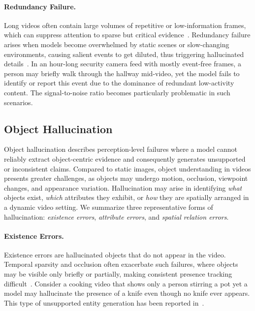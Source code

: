 \documentclass[10pt]{article} %
\begin{document}
\paragraph{Redundancy Failure.}
Long videos often contain large volumes of repetitive or low-information frames, which can suppress attention to sparse but critical evidence~\citep{yunzhuzhang2025flexselect, hu2025m, yu2024frame}. Redundancy failure arises when models become overwhelmed by static scenes or slow-changing environments, causing salient events to get diluted, thus triggering hallucinated details~\citep{zhang2025adard, zhang2025prompt, tan2026think}. In an hour-long security camera feed with mostly event-free frames, a person may briefly walk through the hallway mid-video, yet the model fails to identify or report this event due to the dominance of redundant low-activity content. The signal-to-noise ratio becomes particularly problematic in such scenarios.

\subsection{Object Hallucination}\label{subsec:object-hallucination}

Object hallucination describes perception-level failures where a model cannot reliably extract object-centric evidence and consequently generates unsupported or inconsistent claims. Compared to static images, object understanding in videos presents greater challenges, as objects may undergo motion, occlusion, viewpoint changes, and appearance variation. Hallucination may arise in identifying \emph{what} objects exist, \emph{which} attributes they exhibit, or \emph{how} they are spatially arranged in a dynamic video setting. We summarize three representative forms of hallucination: \emph{existence errors}, \emph{attribute errors}, and \emph{spatial relation errors}.

\paragraph{Existence Errors.}
Existence errors are hallucinated objects that do not appear in the video. Temporal sparsity and occlusion often exacerbate such failures, where objects may be visible only briefly or partially, making consistent presence tracking difficult~\citep{lusha2025graph, rawal2025argus, wang2024videohallucer}. Consider a cooking video that shows only a person stirring a pot yet a model may hallucinate the presence of a knife even though no knife ever appears. This type of unsupported entity generation has been reported in~\citep{chang2025mitigating, wang2025object}.
\end{document}
